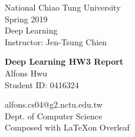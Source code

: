 


\begin{titlepage} %

	
\begin{minipage}{0.4\textwidth} %
    \begin{flushleft} %
    \large
    National Chiao Tung University\\ %
    Spring 2019 \\ %
    Deep Learning \\ %
    Instructor: Jen-Tsung Chien\\ %
    \end{flushleft}
\end{minipage}
	
\vspace*{2in} %
	
\center %

	
{\huge\bfseries Deep Learning HW3 Report}\\[0.4cm] %
Alfons Hwu \\ %
Student ID: 0416324\\
\vfill %


\vfill %

alfons.cs04@g2.nctu.edu.tw \\ %
Dept. of Computer Science \\ %
Composed with \LaTeX  on Overleaf

\vfill %


\vfill %
	
\end{titlepage}
